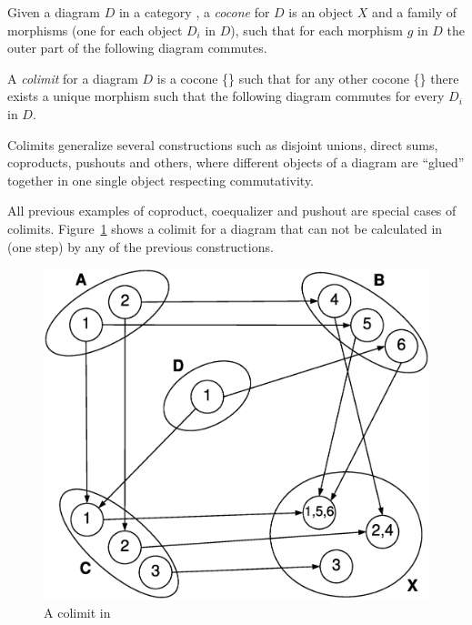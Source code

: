 \begin{definition}[Colimit] Given a diagram $D$ in a category , a \emph{cocone} for $D$ is an object $X$ and a family of morphisms  (one for each object $D_i$ in $D$), such that for each morphism $g$ in $D$ the outer part of the following diagram commutes.

\hfill

  A \emph{colimit} for a diagram $D$ is a cocone \{\} such that for any other cocone \{\} there exists a unique morphism  such that the following diagram commutes for every $D_i$ in $D$.


\end{definition}

\begin{example} Colimits generalize several constructions such as disjoint unions, direct sums, coproducts, pushouts and others, where different objects of a diagram are ``glued'' together in one single object respecting commutativity.

  All previous examples of coproduct, coequalizer and pushout are special cases of colimits. Figure~\ref{fig:gts:colimit} shows a colimit for a diagram that can not be calculated in (one step) by any of the previous constructions.

\begin{figure}[!ht]
  \centering
  \includegraphics[scale=0.4]{images/gts/colimit}
  \caption{A colimit in }\label{fig:gts:colimit}
\end{figure}

\end{example}



